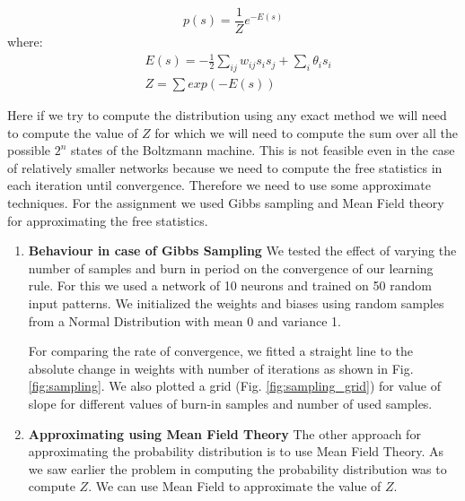 \documentclass{article}
\begin{document}
$$ p(s) = \frac{1}{Z} e^{-E(s)} $$
where: 
\begin{equation}
  \begin{split}
    & E(s) = - \frac{1}{2} \sum_{ij} w_{ij} s_i s_j  + \sum_i \theta_i s_i \\
    & Z = \sum exp(-E(s)) 
  \end{split}
\end{equation}

Here if we try to compute the distribution using any exact method we will need
to compute the value of $ Z $ for which we will need to compute the sum over
all the possible $ 2^n $ states of the Boltzmann machine. This is not feasible 
even in the case of relatively smaller networks because we need to compute the 
free statistics in each iteration until convergence. Therefore we need to use
some approximate techniques. For the assignment we used Gibbs sampling and 
Mean Field theory for approximating the free statistics.

\begin{enumerate}
  \item \textbf{Behaviour in case of Gibbs Sampling}
    We tested the effect of varying the number of samples and burn in period on
    the convergence of our learning rule. For this we used a network of 10 
    neurons and trained on 50 random input patterns. We initialized the weights
    and biases using random samples from a Normal Distribution with mean 0 and 
    variance 1.

    For comparing the rate of convergence, we fitted a straight line to the 
    absolute change in weights with number of iterations as shown in Fig. 
    \ref{fig:sampling}. We also plotted a grid (Fig. \ref{fig:sampling_grid}) for 
    value of slope for different values of burn-in samples and number of used
    samples.


  \item \textbf{Approximating using Mean Field Theory}
    The other approach for approximating the probability distribution is to 
    use Mean Field Theory. As we saw earlier the problem in computing the probability 
    distribution was to compute $ Z $. We can use Mean Field to approximate the
    value of $ Z $. 

\end{enumerate}
\end{document}
